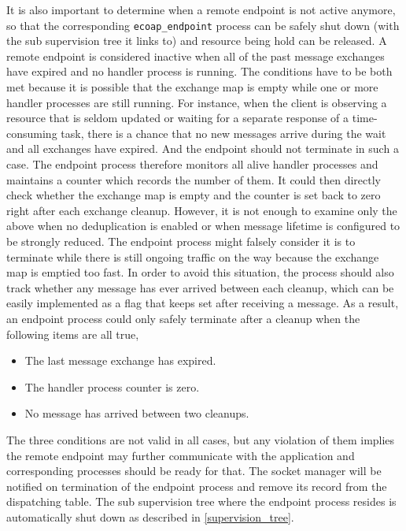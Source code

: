 It is also important to determine when a remote endpoint is not active anymore, so that the corresponding \verb|ecoap_endpoint| process can be safely shut down (with the sub supervision tree it links to) and resource being hold can be released. A remote endpoint is considered inactive when all of the past message exchanges have expired and no handler process is running. The conditions have to be both met because it is possible that the exchange map is empty while one or more handler processes are still running. For instance, when the client is observing a resource that is seldom updated or waiting for a separate response of a time-consuming task, there is a chance that no new messages arrive during the wait and all exchanges have expired. And the endpoint should not terminate in such a case. The endpoint process therefore monitors all alive handler processes and maintains a counter which records the number of them. It could then directly check whether the exchange map is empty and the counter is set back to zero right after each exchange cleanup. However, it is not enough to examine only the above when no deduplication is enabled or when message lifetime is configured to be strongly reduced. The endpoint process might falsely consider it is to terminate while there is still ongoing traffic on the way because the exchange map is emptied too fast. In order to avoid this situation, the process should also track whether any message has ever arrived between each cleanup, which can be easily implemented as a flag that keeps set after receiving a message. As a result, an endpoint process could only safely terminate after a cleanup when the following items are all true,

\begin{itemize}

\item The last message exchange has expired.
\item The handler process counter is zero.
\item No message has arrived between two cleanups. 

\end{itemize}

The three conditions are not valid in all cases, but any violation of them implies the remote endpoint may further communicate with the application and corresponding processes should be ready for that. The socket manager will be notified on termination of the endpoint process and remove its record from the dispatching table. The sub supervision tree where the endpoint process resides is automatically shut down as described in \ref{supervision_tree}. 

